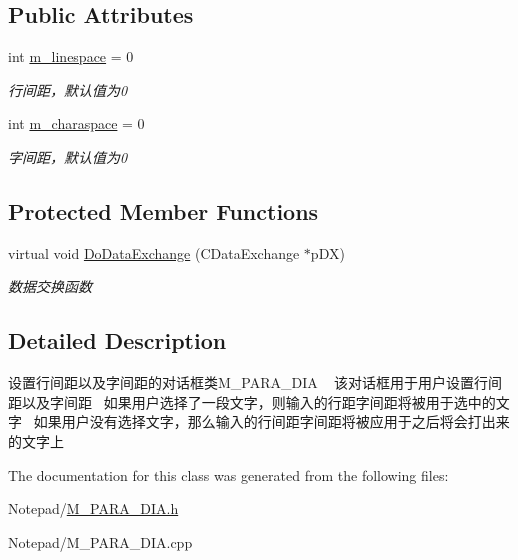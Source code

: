 \subsection*{Public Attributes}
\begin{DoxyCompactItemize}
\item 
\mbox{\label{class_m___p_a_r_a___d_i_a_aea31fe9cfbcfd5a9c9d218a0f5a821f7}} 
int \hyperlink{class_m___p_a_r_a___d_i_a_aea31fe9cfbcfd5a9c9d218a0f5a821f7}{m\+\_\+linespace} = 0
\begin{DoxyCompactList}\small\item\em 行间距，默认值为0 \end{DoxyCompactList}\item 
\mbox{\label{class_m___p_a_r_a___d_i_a_abdddacb23484b11c4ddf7be621fecd74}} 
int \hyperlink{class_m___p_a_r_a___d_i_a_abdddacb23484b11c4ddf7be621fecd74}{m\+\_\+charaspace} = 0
\begin{DoxyCompactList}\small\item\em 字间距，默认值为0 \end{DoxyCompactList}\end{DoxyCompactItemize}
\subsection*{Protected Member Functions}
\begin{DoxyCompactItemize}
\item 
\mbox{\label{class_m___p_a_r_a___d_i_a_a7d7ff9f843610a3ddccd12da36df7751}} 
virtual void \hyperlink{class_m___p_a_r_a___d_i_a_a7d7ff9f843610a3ddccd12da36df7751}{Do\+Data\+Exchange} (C\+Data\+Exchange $\ast$p\+DX)
\begin{DoxyCompactList}\small\item\em 数据交换函数 \end{DoxyCompactList}\end{DoxyCompactItemize}


\subsection{Detailed Description}
设置行间距以及字间距的对话框类\+M\+\_\+\+P\+A\+R\+A\+\_\+\+D\+IA ~\newline
该对话框用于用户设置行间距以及字间距~\newline
如果用户选择了一段文字，则输入的行距字间距将被用于选中的文字~\newline
如果用户没有选择文字，那么输入的行间距字间距将被应用于之后将会打出来的文字上~\newline


The documentation for this class was generated from the following files\+:\begin{DoxyCompactItemize}
\item 
Notepad/\hyperlink{_m___p_a_r_a___d_i_a_8h}{M\+\_\+\+P\+A\+R\+A\+\_\+\+D\+I\+A.\+h}\item 
Notepad/M\+\_\+\+P\+A\+R\+A\+\_\+\+D\+I\+A.\+cpp\end{DoxyCompactItemize}
